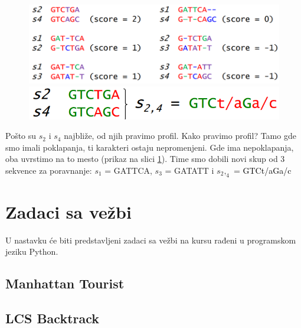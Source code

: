 \begin{figure}[h]
	\begin{minipage}{0.55\textwidth}
		\includegraphics[width=\linewidth]{poglavlja/5/slike/sestDvostrukih.png}
		\caption{}
		\label{slika:sestDvostrukih}
	\end{minipage}
	\hfill
	\begin{minipage}{0.35\textwidth}
		\includegraphics[width=\linewidth]{poglavlja/5/slike/profil.png}
		\caption{}
		\label{slika:profil}
	\end{minipage}
\end{figure}

Pošto su $s_2$ i $s_4$ najbliže, od njih pravimo profil. Kako pravimo profil? Tamo gde smo imali poklapanja, ti karakteri ostaju nepromenjeni. Gde ima nepoklapanja, oba uvrstimo na to mesto (prikaz na slici \ref{slika:profil}). Time smo dobili novi skup od 3 sekvence za poravnanje: $s_1$ = GATTCA, $s_3$ = GATATT i $s_2,_4$ = \textcolor{black}{GTC}\textcolor{black}{t/a}\textcolor{black}{G}\textcolor{black}{a/c}

\iffalse

\newpage
\section{Zadaci sa vežbi}
\setexamplecodestyle

U nastavku će biti predstavljeni zadaci sa vežbi na kursu rađeni u programskom jeziku Python.

\subsection{Manhattan Tourist}



\subsection{LCS Backtrack}

